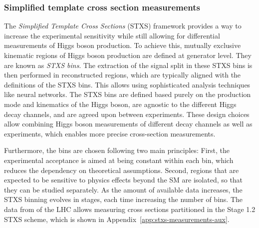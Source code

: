 
\subsubsection{Simplified template cross section measurements}
The \emph{Simplified Template Cross Sections} (STXS) framework provides a way to increase the experimental sensitivity while still allowing for differential measurements of Higgs boson production.
To achieve this, mutually exclusive kinematic regions of Higgs boson production are defined at generator level. They are known as \emph{STXS bins}. 
The extraction of the signal split in these STXS bins is then performed in reconstructed regions, which are typically aligned with the definitions of the STXS bins. This allows using sophisticated analysis techniques like neural networks.
The STXS bins are defined based purely on the production mode and kinematics of the Higgs boson, are agnostic to the different Higgs decay channels, and are agreed upon between experiments.
These design choices allow combining Higgs boson measurements of different decay channels as well as experiments, which enables more precise cross-section measurements.

Furthermore, the bins are chosen following two main principles: First, the experimental acceptance is aimed at being constant within each bin, which reduces the dependency on theoretical assumptions. Second, regions that are expected to be sensitive to physics effects beyond the SM are isolated, so that they can be studied separately.
As the amount of available data increases, the STXS binning evolves in stages, each time increasing the number of bins. 
The data from \RunTwo of the LHC allows measuring cross sections partitioned in the Stage 1.2 STXS scheme, which is shown in Appendix~\ref{app:stxs-measurements-aux}.

